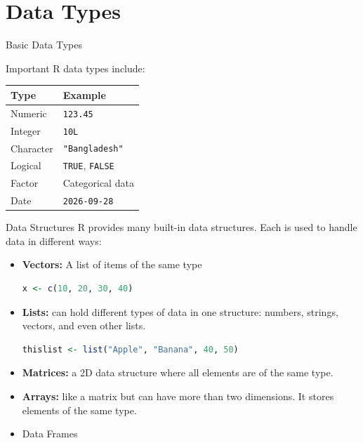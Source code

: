 \documentclass[aspectratio=169,11pt]{beamer}
\begin{document}
	
	\section{Data Types}
	
	\begin{frame}{Basic Data Types}
		
		Important R data types include:
		
		\begin{table}
			\centering
			\begin{tabular}{ll}
				\toprule
				Type & Example \\
				\midrule
				Numeric & \texttt{123.45} \\
				Integer & \texttt{10L} \\
				Character & \texttt{"Bangladesh"} \\
				Logical & \texttt{TRUE}, \texttt{FALSE} \\
				Factor & Categorical data \\
				Date & \texttt{2026-09-28} \\
				\bottomrule
			\end{tabular}
		\end{table}
		
	\end{frame}
	
	
	
	\begin{frame}[fragile]{Data Structures}
		R provides many built-in data structures. Each is used to handle data in different ways:
		\begin{itemize}
			\item \textbf{Vectors:} A list of items of the same type
			    \begin{lstlisting}[language=R]
				x <- c(10, 20, 30, 40)
			\end{lstlisting}
			\item \textbf{Lists:} can hold different types of data in one structure: numbers, strings, vectors, and even other lists.
			
			 \begin{lstlisting}[language=R]
				thislist <- list("Apple", "Banana", 40, 50)
			\end{lstlisting}
			
			\item \textbf{Matrices:} a 2D data structure where all elements are of the same type.
			\item \textbf{Arrays:} like a matrix but can have more than two dimensions. It stores elements of the same type.
			\item Data Frames
		\end{itemize}
		
	\end{frame}
	
\end{document}
